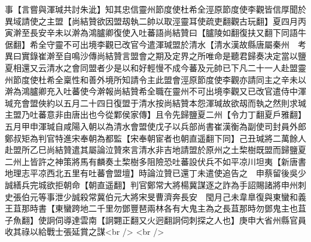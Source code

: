 事【言嘗與渾瑊共討朱泚】知其忠信靈州節度使杜希全涇原節度使李觀皆信厚聞於異域請使之主盟【尚結贊欲因盟刼執二帥以取涇靈耳使疏吏翻觀古玩翻】夏四月丙寅澣至長安辛未以澣為鴻臚卿復使入吐蕃語尚結贊曰【臚陵如翻復扶又翻下同語牛倨翻】希全守靈不可出境李觀已改官今遣渾瑊盟於清水【清水漢故縣唐屬秦州　考異曰實錄崔澣至自鳴沙傳尚結贊言盟會之期及定界之所唯命是聽君歸奏决定當以鹽夏相還又云清水之會同盟者少是以和好輕慢不成今蕃及元帥已下凡二十一人赴盟靈州節度使杜希全稟性和善外境所知請令主此盟會涇原節度使李觀亦請同主之辛未以澣為鴻臚卿充入吐蕃使今澣報尚結贊希全職在靈州不可出境李觀又已改官遣侍中渾瑊充會盟俠約以五月二十四日復盟于清水按尚結贊本怨渾瑊故欲刼而執之然則求瑊主盟乃吐蕃意非由唐出也今從鄴侯家傳】且令先歸鹽夏二州【令力丁翻夏戶雅翻】五月甲申渾瑊自咸陽入朝以為清水會盟使戊子以兵部尚書崔漢衡為副使司封員外郎鄭叔矩為判官特進宋奉朝為都監【宋奉朝宦者也朝直遥翻下同】己丑瑊將二萬餘人赴盟所乙巳尚結贊遣其屬論泣贊來言清水非吉地請盟於原州之土棃樹既盟而歸鹽夏二州上皆許之神策將馬有麟奏土棃樹多阻險恐吐蕃設伏兵不如平凉川坦夷【新唐書地理志平凉西北五里有吐蕃會盟壇】時論泣贊已還丁未遣使追告之　申蔡留後吳少誠繕兵完城欲拒朝命【朝直遥翻】判官鄭常大將楊冀謀逐之詐為手詔賜諸將申州刺史張伯元等事泄少誠殺常冀伯元大將宋旻曹濟奔長安　閠月己未韋臯復與東蠻和義王苴那時書【東蠻跨地二千里勿鄧豐琶兩林各有大鬼主為之長苴那時勿鄧鬼主也苴子魚翻】使詗伺導達雲南【詗翾正翻又火迥翻詗伺刺探之人也】庚申大省州縣官員收其祿以給戰士張延賞之謀<br />
<br />
